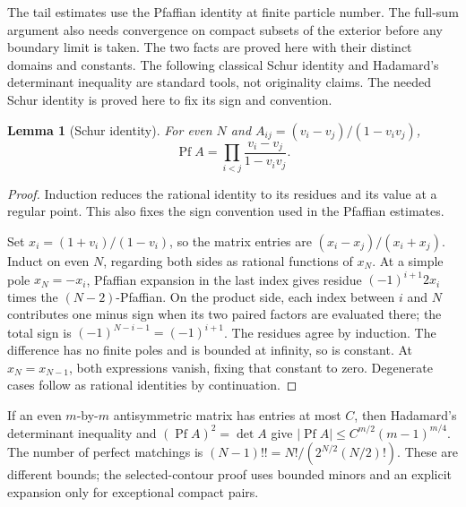 \documentclass[11pt]{article}
\numberwithin{equation}{section}
\newtheorem{lemma}[theorem]{Lemma}
\theoremstyle{definition}
\newcommand{\Pf}{\operatorname{Pf}}
\begin{document}
The tail estimates use the Pfaffian identity at finite particle number.
The full-sum argument also needs convergence on compact subsets of the
exterior before any boundary limit is taken. The two facts are proved
here with their distinct domains and constants.
The following classical Schur identity and Hadamard's determinant
inequality are standard tools, not originality claims. The needed
Schur identity is proved here to fix its sign and convention.
\begin{lemma}[Schur identity]\label{lem:schur}
For even \(N\) and \(A_{ij}=(v_i-v_j)/(1-v_iv_j)\),
\[
 \Pf A=\prod_{i<j}\frac{v_i-v_j}{1-v_iv_j}.
\]
\end{lemma}
\begin{proof}
Induction reduces the rational identity to its residues and its value at a regular point. This also fixes the sign convention used in the Pfaffian estimates.

Set \(x_i=(1+v_i)/(1-v_i)\), so the matrix entries are
\((x_i-x_j)/(x_i+x_j)\).
Induct on even \(N\), regarding both sides as rational functions of
\(x_N\). At a simple pole \(x_N=-x_i\), Pfaffian expansion in the
last index gives residue
\((-1)^{i+1}2x_i\) times the \((N-2)\)-Pfaffian.
On the product side, each index between \(i\) and \(N\) contributes
one minus sign when its two paired factors are evaluated there;
the total sign is \((-1)^{N-i-1}=(-1)^{i+1}\).
The residues agree by induction. The difference has no finite poles
and is bounded at infinity, so is constant. At \(x_N=x_{N-1}\),
both expressions vanish, fixing that constant to zero.
Degenerate cases follow as rational identities by continuation.
\end{proof}

If an even \(m\)-by-\(m\) antisymmetric matrix has entries at most \(C\),
then Hadamard's determinant inequality and
\((\Pf A)^2=\det A\) give
\(|\Pf A|\le C^{m/2}(m-1)^{m/4}\).
The number of perfect matchings is
\((N-1)!!=N!/(2^{N/2}(N/2)!)\).
These are different bounds; the selected-contour proof uses bounded
minors and an explicit expansion only for exceptional compact pairs.
\end{document}
